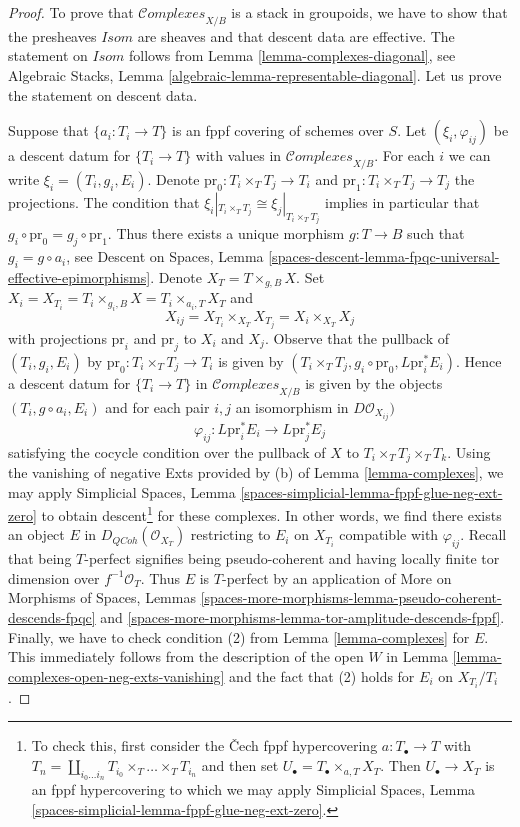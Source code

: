 \documentclass{stacks-project}
\theoremstyle{plain}
\theoremstyle{definition}
\theoremstyle{remark}
\numberwithin{equation}{subsection}
\def\QCoh{\mathit{QCoh}}
\def\Complexesstack{\mathcal{C}\!\mathit{omplexes}}
\begin{document}
\begin{proof}
To prove that $\Complexesstack_{X/B}$ is a stack in groupoids,
we have to show that the presheaves $\mathit{Isom}$ are sheaves
and that descent data are effective. The statement on
$\mathit{Isom}$ follows from Lemma \ref{lemma-complexes-diagonal}, see
Algebraic Stacks, Lemma \ref{algebraic-lemma-representable-diagonal}.
Let us prove the statement on descent data.

\medskip\noindent
Suppose that $\{a_i : T_i \to T\}$ is an fppf covering of schemes over $S$.
Let $(\xi_i, \varphi_{ij})$ be a descent datum for $\{T_i \to T\}$
with values in $\Complexesstack_{X/B}$.
For each $i$ we can write $\xi_i = (T_i, g_i, E_i)$.
Denote $\text{pr}_0 : T_i \times_T T_j \to T_i$ and
$\text{pr}_1 : T_i \times_T T_j \to T_j$ the projections.
The condition that $\xi_i|_{T_i \times_T T_j} \cong \xi_j|_{T_i \times_T T_j}$
implies in particular that $g_i \circ \text{pr}_0 = g_j \circ \text{pr}_1$.
Thus there exists a unique morphism $g : T \to B$ such that
$g_i = g \circ a_i$, see
Descent on Spaces, Lemma
\ref{spaces-descent-lemma-fpqc-universal-effective-epimorphisms}.
Denote $X_T = T \times_{g, B} X$. Set
$X_i = X_{T_i} = T_i \times_{g_i, B} X = T_i \times_{a_i, T} X_T$
and
$$
X_{ij} = X_{T_i} \times_{X_T} X_{T_j} = X_i \times_{X_T} X_j
$$
with projections $\text{pr}_i$ and $\text{pr}_j$ to $X_i$ and $X_j$.
Observe that the pullback of $(T_i, g_i, E_i)$
by $\text{pr}_0 : T_i \times_T T_j \to T_i$ is given by
$(T_i \times_T T_j, g_i \circ \text{pr}_0, L\text{pr}_i^*E_i)$.
Hence a descent datum for $\{T_i \to T\}$ in $\Complexesstack_{X/B}$
is given by the objects $(T_i, g \circ a_i, E_i)$
and for each pair $i, j$ an isomorphism in
$D\mathcal{O}_{X_{ij}})$
$$
\varphi_{ij} :
L\text{pr}_i^*E_i \longrightarrow L\text{pr}_j^*E_j
$$
satisfying the cocycle condition over the pullback of $X$ to
$T_i \times_T T_j \times_T T_k$.
Using the vanishing of negative Exts provided by (b) of
Lemma \ref{lemma-complexes}, we may apply
Simplicial Spaces, Lemma \ref{spaces-simplicial-lemma-fppf-glue-neg-ext-zero}
to obtain descent\footnote{To check this, first consider the
{\v C}ech fppf hypercovering $a : T_\bullet \to T$ with
$T_n = \coprod_{i_0 \ldots i_n} T_{i_0} \times_T \ldots \times_T T_{i_n}$
and then set $U_\bullet = T_\bullet \times_{a, T} X_T$. Then
$U_\bullet \to X_T$ is an fppf hypercovering to which we may
apply Simplicial Spaces, Lemma
\ref{spaces-simplicial-lemma-fppf-glue-neg-ext-zero}.}
for these complexes. In other words, we find there exists an object
$E$ in $D_\QCoh(\mathcal{O}_{X_T})$ restricting to $E_i$ on $X_{T_i}$
compatible with $\varphi_{ij}$. Recall that being
$T$-perfect signifies being pseudo-coherent and having
locally finite tor dimension over $f^{-1}\mathcal{O}_T$.
Thus $E$ is $T$-perfect by an application of
More on Morphisms of Spaces, Lemmas
\ref{spaces-more-morphisms-lemma-pseudo-coherent-descends-fpqc} and
\ref{spaces-more-morphisms-lemma-tor-amplitude-descends-fppf}.
Finally, we have to check condition (2) from
Lemma \ref{lemma-complexes} for $E$.
This immediately follows from the description of the open $W$
in Lemma \ref{lemma-complexes-open-neg-exts-vanishing}
and the fact that (2) holds for $E_i$ on $X_{T_i}/T_i$.
\end{proof}
\end{document}
